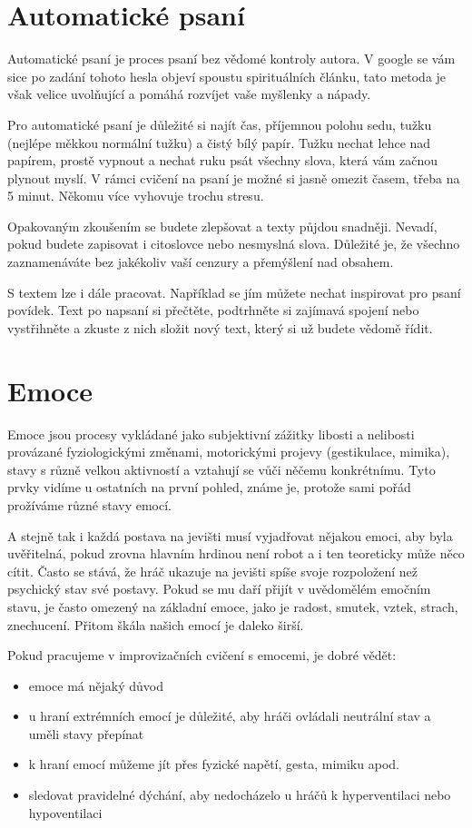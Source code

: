 \documentclass[main.tex]{subfiles}
\begin{document}
\needspace{5cm} \section{Automatické psaní} \label{automatické psaní} Automatické psaní je proces psaní bez vědomé kontroly autora. V google se vám sice po zadání tohoto hesla objeví spoustu spirituálních článku, tato metoda je však velice uvolňující a pomáhá rozvíjet vaše myšlenky a nápady. 
 
Pro automatické psaní je důležité si najít čas, příjemnou polohu sedu, tužku (nejlépe měkkou normální tužku) a čistý bílý papír.  
Tužku nechat lehce nad papírem, prostě vypnout a nechat ruku psát všechny slova, která vám začnou plynout myslí. 
V rámci cvičení na psaní je možné si jasně omezit časem, třeba na 5 minut. Někomu více vyhovuje trochu stresu. 
 
Opakovaným zkoušením se budete zlepšovat a texty půjdou snadněji. 
Nevadí, pokud budete zapisovat i citoslovce nebo nesmyslná slova. Důležité je, že všechno zaznamenáváte bez jakékoliv vaší cenzury a přemýšlení nad obsahem. 
 
S textem lze i dále pracovat. Například se jím můžete nechat inspirovat pro psaní povídek. 
Text po napsaní si přečtěte, podtrhněte si zajímavá spojení nebo vystřihněte a zkuste z nich složit nový text, který si už budete vědomě řídit. 
\needspace{5cm} \section{Emoce} \label{emoce} Emoce jsou procesy vykládané jako subjektivní zážitky libosti a nelibosti provázané fyziologickými změnami, motorickými projevy (gestikulace, mimika), stavy s různě velkou aktivností a vztahují se vůči něčemu konkrétnímu. Tyto prvky vidíme u ostatních na první pohled, známe je, protože sami pořád prožíváme různé stavy emocí. 
 
A stejně tak i každá postava na jevišti musí vyjadřovat nějakou emoci, aby byla uvěřitelná, pokud zrovna hlavním hrdinou není robot a i ten teoreticky může něco cítit. Často se stává, že hráč ukazuje na jevišti spíše svoje rozpoložení než psychický stav své postavy. Pokud se mu daří přijít v uvědomělém emočním stavu, je často omezený na základní emoce, jako je radost, smutek, vztek, strach, znechucení. Přitom škála našich emocí je daleko širší. 
 
Pokud pracujeme v improvizačních cvičení s emocemi, je dobré vědět: 
\begin{itemize}
\item  emoce má nějaký důvod
\item  u hraní extrémních emocí je důležité, aby hráči ovládali neutrální stav a uměli stavy přepínat
\item  k hraní emocí můžeme jít přes fyzické napětí, gesta, mimiku apod.
\item  sledovat pravidelné dýchání, aby nedocházelo u hráčů k hyperventilaci nebo hypoventilaci
\end{itemize}
 
\end{document}
